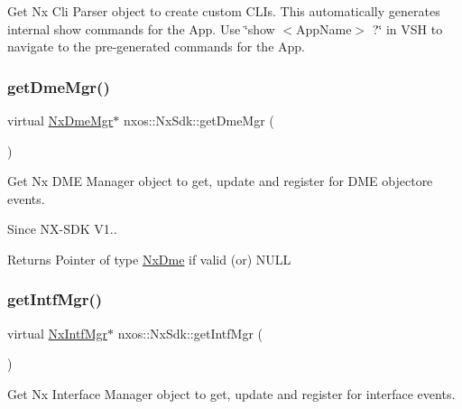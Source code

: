 Get Nx Cli Parser object to create custom C\+L\+Is. This automatically generates internal show commands for the App. Use \char`\"{}show $<$\+App\+Name$>$ ?\char`\"{} in V\+SH to navigate to the pre-\/generated commands for the App. \mbox{\label{classnxos_1_1_nx_sdk_a089933980bfe0466870510bb94158763}} 
\subsubsection{\texorpdfstring{get\+Dme\+Mgr()}{getDmeMgr()}}
{\footnotesize\ttfamily virtual \mbox{\hyperlink{classnxos_1_1_nx_dme_mgr}{Nx\+Dme\+Mgr}}$\ast$ nxos\+::\+Nx\+Sdk\+::get\+Dme\+Mgr (\begin{DoxyParamCaption}{ }\end{DoxyParamCaption})\hspace{0.3cm}{\ttfamily [pure virtual]}}

Get Nx D\+ME Manager object to get, update and register for D\+ME objectore events.

\begin{DoxySince}{Since}
N\+X-\/\+S\+DK V1.. 
\end{DoxySince}
\begin{DoxyReturn}{Returns}
Pointer of type \mbox{\hyperlink{classnxos_1_1_nx_dme}{Nx\+Dme}} if valid (or) N\+U\+LL 
\end{DoxyReturn}
\mbox{\label{classnxos_1_1_nx_sdk_ac860ca0ab2bd58d28f990685c63906a0}} 
\subsubsection{\texorpdfstring{get\+Intf\+Mgr()}{getIntfMgr()}}
{\footnotesize\ttfamily virtual \mbox{\hyperlink{classnxos_1_1_nx_intf_mgr}{Nx\+Intf\+Mgr}}$\ast$ nxos\+::\+Nx\+Sdk\+::get\+Intf\+Mgr (\begin{DoxyParamCaption}{ }\end{DoxyParamCaption})\hspace{0.3cm}{\ttfamily [pure virtual]}}

Get Nx Interface Manager object to get, update and register for interface events.

